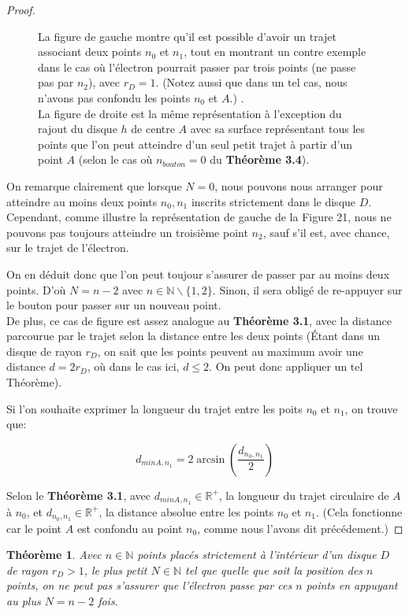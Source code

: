 \documentclass{amsart}
\newtheorem{theorem}{Théorème}[section]
\theoremstyle{definition}
\theoremstyle{remark}
\numberwithin{equation}{section}
\begin{document}
\begin{proof}
\begin{figure}[H]
    \caption{La figure de gauche montre qu'il est possible d'avoir un trajet associant deux points $n_0$ et $n_1$, tout en montrant un contre exemple dans le cas où l'électron pourrait passer par trois points (ne passe pas par $n_2$), avec $r_D=1$. (Notez aussi que dans un tel cas, nous n'avons pas confondu les points $n_0$ et $A$.)
    . \\La figure de droite est la même représentation à l'exception du rajout du disque $h$ de centre $A$ avec sa surface représentant tous les points que l'on peut atteindre d'un seul petit trajet à partir d'un point $A$ (selon le cas où $n_{bouton}=0$ du \textbf{Théorème 3.4}).}
  \end{figure}

  On remarque clairement que lorsque $N=0$, nous pouvons nous arranger pour atteindre au moins deux points $n_0,n_1$ inscrits strictement dans le disque $D$. Cependant, comme illustre la représentation de gauche de la Figure 21, nous ne pouvons pas 
  toujours atteindre un troisième point $n_2$, sauf s'il est, avec chance, sur le trajet de l'électron.

  On en déduit donc que l'on peut toujour s'assurer de passer par au moins deux points. D'où $N=n-2$ avec $n\in\mathbb{N}\backslash\lbrace{1,2}\rbrace$.
  Sinon, il sera obligé de re-appuyer sur le bouton pour passer sur un nouveau point. \\

  De plus, ce cas de figure est assez analogue au \textbf{Théorème 3.1}, avec la distance parcourue par le trajet selon la distance entre les deux points (Étant dans un disque de rayon $r_D$, on sait que les points peuvent au maximum avoir une distance $d=2r_D$, où dans le cas ici, $d\leq2$. On peut donc appliquer un tel Théorème).

  Si l'on souhaite exprimer la longueur du trajet entre les poits $n_0$ et $n_1$, on trouve que:

  \[d_{min A,n_1}=2\arcsin(\frac{d_{n_0,n_1}}{2})\]

  Selon le \textbf{Théorème 3.1}, avec $d_{min A,n_1}\in\mathbb{R^+}$, la longueur du trajet circulaire de $A$ à $n_0$, et $d_{n_0,n_1}\in\mathbb{R^+}$, la distance absolue entre les points $n_0$ et $n_1$. (Cela fonctionne car le point $A$ est confondu au point $n_0$, comme nous l'avons dit précédement.)
\end{proof}

\begin{theorem}
  Avec $n\in\mathbb{N}$ points placés strictement à l'intérieur d'un disque $D$ de rayon $r_D>1$, le plus petit $N\in\mathbb{N}$ tel que quelle que soit la
  position des $n$ points, on ne peut pas s’assurer que l’électron passe par ces $n$ points en appuyant au plus $N=n-2$ fois.
\end{theorem}
\end{document}
